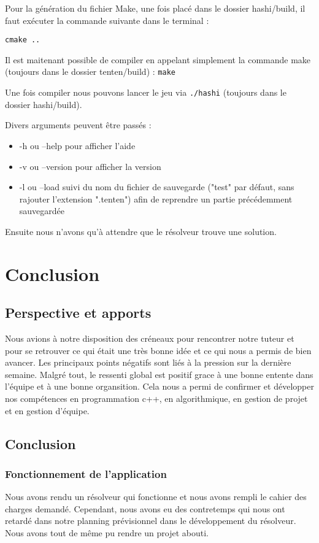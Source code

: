 \documentclass{article}
\begin{document}
Pour la génération du fichier Make, une fois placé dans le dossier hashi/build, il faut exécuter la commande suivante dans le terminal :

\noindent \texttt{cmake ..}

Il est maitenant possible de compiler en appelant simplement la commande make (toujours dans le dossier tenten/build) :\newline
\texttt{make}


Une fois compiler nous pouvons lancer le jeu via \texttt{./hashi} (toujours dans le dossier hashi/build).

Divers arguments peuvent être passés :
\begin{itemize}
\item -h ou --help pour afficher l'aide
\item -v ou --version pour afficher la version
\item -l ou --load suivi du nom du fichier de sauvegarde ("test" par défaut, sans rajouter l'extension ".tenten") afin de reprendre un partie précédemment sauvegardée
\end{itemize}
Ensuite nous n'avons qu'à attendre que le résolveur trouve une solution.

\section{\LARGE Conclusion}

    \subsection{\Large Perspective et apports}
    \hspace{0.5cm} Nous avions à notre disposition des créneaux pour rencontrer notre tuteur et pour se retrouver ce qui était une très bonne idée et ce qui nous a permis de bien avancer. \newline
    Les principaux points négatifs sont liés à la pression sur la dernière semaine.  Malgré tout, le ressenti global est positif grace à une bonne entente dans l'équipe et à une bonne organsition. Cela nous a permi de confirmer et développer nos compétences en programmation c++, en algorithmique, en gestion de projet et en gestion d'équipe.

    \subsection{\Large Conclusion}
        \subsubsection{\large Fonctionnement de l’application}
        \hspace{0.5cm} Nous avons rendu un résolveur qui fonctionne et nous avons rempli le cahier des charges demandé. Cependant, nous avons eu des contretemps qui nous ont retardé dans notre planning prévisionnel dans le développement du résolveur. Nous avons tout de même pu rendre un projet abouti.
\end{document}
